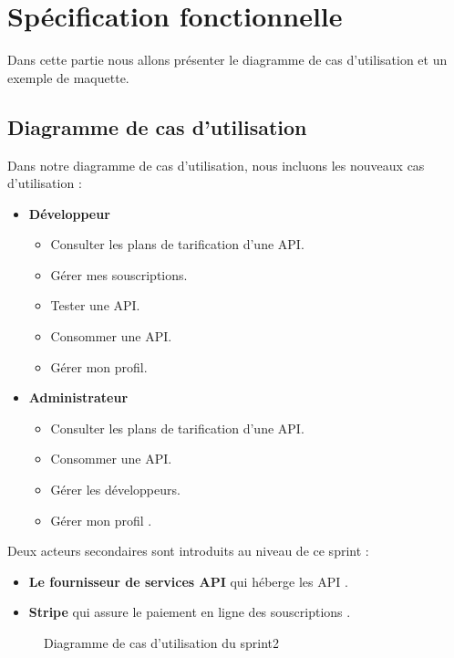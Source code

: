 \section{Spécification fonctionnelle}
Dans cette partie nous allons présenter le diagramme de cas d'utilisation et un exemple de maquette.
  \subsection{Diagramme de cas d'utilisation}
  Dans notre diagramme de cas d'utilisation, nous incluons les nouveaux cas d'utilisation :
  \begin{itemize}
    \item  \textbf{Développeur}
    \begin{itemize}
        \item  Consulter les plans de tarification d'une API.
        \item Gérer mes souscriptions.
        \item Tester une API.
        \item Consommer une API.
        \item Gérer mon profil.
    \end{itemize} 
    \pagebreak

    \item  \textbf{Administrateur}
    \begin{itemize}
        \item Consulter les plans de tarification d'une API.
        \item Consommer une API.
        \item Gérer les développeurs.
        \item Gérer mon profil .
    \end{itemize}
   
\end{itemize}
Deux acteurs secondaires sont introduits au niveau de ce sprint :
\begin{itemize}
    \item \textbf{Le fournisseur de services API} qui héberge les API .
    \item \textbf{Stripe} qui assure le paiement en ligne des souscriptions .
\end{itemize}


\begin{figure}[H]
    \centering
    \caption{Diagramme de cas d'utilisation du sprint2}
    \label{fig:logo_tt}
\end{figure} 
\pagebreak

